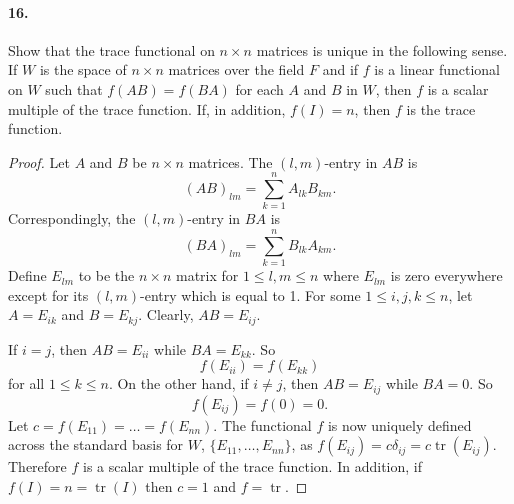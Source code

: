 \documentclass{article}
\DeclareMathOperator{\tr}{tr}
\begin{document}
\paragraph{16.} Show that the trace functional on $n \times n$ matrices is
unique in the following sense. If $W$ is the space of $n \times n$ matrices over
the field $F$ and if $f$ is a linear functional on $W$ such that $f(AB) = f(BA)$
for each $A$ and $B$ in $W$, then $f$ is a scalar multiple of the trace
function. If, in addition, $f(I) = n$, then $f$ is the trace function.

\begin{proof}
  Let $A$ and $B$ be $n \times n$ matrices. The $(l, m)$-entry in $AB$ is \[
    (AB)_{lm} = \sum_{k=1}^n A_{lk}B_{km}.
  \] Correspondingly, the $(l, m)$-entry in $BA$ is \[
    (BA)_{lm} = \sum_{k=1}^n B_{lk}A_{km}.
  \] Define $E_{lm}$ to be the $n \times n$ matrix for $1 \leq l, m \leq n$
  where $E_{lm}$ is zero everywhere except for its $(l, m)$-entry which is equal
  to 1. For some $1 \leq i, j, k \leq n$, let $A = E_{ik}$ and $B = E_{kj}$.
  Clearly, $AB = E_{ij}$.

  If $i = j$, then $AB = E_{ii}$ while $BA = E_{kk}$. So \[
    f(E_{ii}) = f(E_{kk})
  \] for all $1 \leq k \leq n$. On the other hand, if $i \neq j$, then $AB =
  E_{ij}$ while $BA = 0$. So \[
    f(E_{ij}) = f(0) = 0.
  \] Let $c = f(E_{11}) = \ldots = f(E_{nn})$. The functional $f$ is now
  uniquely defined across the standard basis for $W$, $\{E_{11}, \ldots,
  E_{nn}\}$, as $f(E_{ij}) = c\delta_{ij} = c\tr(E_{ij})$. Therefore $f$ is a
  scalar multiple of the trace function. In addition, if $f(I) = n = \tr(I)$
  then $c = 1$ and $f = \tr$.
\end{proof}
\end{document}
